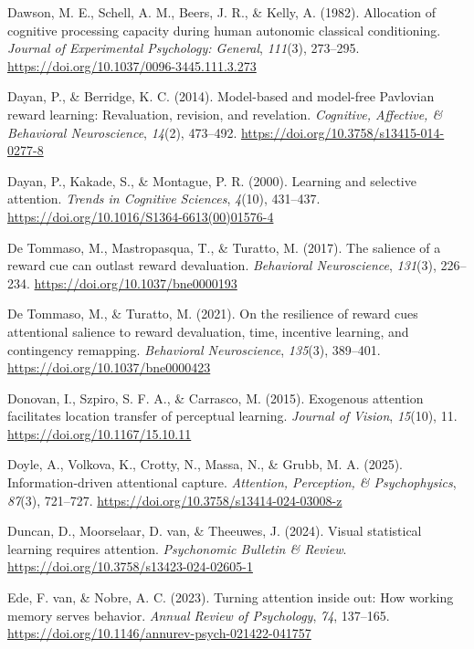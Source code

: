\documentclass[
  man,
  floatsintext,
  longtable,
  nolmodern,
  notxfonts,
  notimes,
  mask,
  colorlinks=true,linkcolor=blue,citecolor=blue,urlcolor=blue]{apa7}
\newlength{\cslhangindent}
\newenvironment{CSLReferences}[2] %
 {\begin{list}{}{%
  \setlength{\itemindent}{0pt}
  \setlength{\leftmargin}{0pt}
  \setlength{\parsep}{0pt}
  \ifodd #1
   \setlength{\leftmargin}{\cslhangindent}
   \setlength{\itemindent}{-1\cslhangindent}
  \fi
  \setlength{\itemsep}{#2\baselineskip}}}
 {\end{list}}
\begin{document}
\begin{CSLReferences}{1}{0}
Dawson, M. E., Schell, A. M., Beers, J. R., \& Kelly, A. (1982).
Allocation of cognitive processing capacity during human autonomic
classical conditioning. \emph{Journal of Experimental Psychology:
General}, \emph{111}(3), 273--295.
\url{https://doi.org/10.1037/0096-3445.111.3.273}

Dayan, P., \& Berridge, K. C. (2014). Model-based and model-free
Pavlovian reward learning: Revaluation, revision, and revelation.
\emph{Cognitive, Affective, \& Behavioral Neuroscience}, \emph{14}(2),
473--492. \url{https://doi.org/10.3758/s13415-014-0277-8}

Dayan, P., Kakade, S., \& Montague, P. R. (2000). Learning and selective
attention. \emph{Trends in Cognitive Sciences}, \emph{4}(10), 431--437.
\url{https://doi.org/10.1016/S1364-6613(00)01576-4}

De Tommaso, M., Mastropasqua, T., \& Turatto, M. (2017). The salience of
a reward cue can outlast reward devaluation. \emph{Behavioral
Neuroscience}, \emph{131}(3), 226--234.
\url{https://doi.org/10.1037/bne0000193}

De Tommaso, M., \& Turatto, M. (2021). On the resilience of reward cues
attentional salience to reward devaluation, time, incentive learning,
and contingency remapping. \emph{Behavioral Neuroscience},
\emph{135}(3), 389--401. \url{https://doi.org/10.1037/bne0000423}

Donovan, I., Szpiro, S. F. A., \& Carrasco, M. (2015). Exogenous
attention facilitates location transfer of perceptual learning.
\emph{Journal of Vision}, \emph{15}(10), 11.
\url{https://doi.org/10.1167/15.10.11}

Doyle, A., Volkova, K., Crotty, N., Massa, N., \& Grubb, M. A. (2025).
Information-driven attentional capture. \emph{Attention, Perception, \&
Psychophysics}, \emph{87}(3), 721--727.
\url{https://doi.org/10.3758/s13414-024-03008-z}

Duncan, D., Moorselaar, D. van, \& Theeuwes, J. (2024). Visual
statistical learning requires attention. \emph{Psychonomic Bulletin \&
Review}. \url{https://doi.org/10.3758/s13423-024-02605-1}

Ede, F. van, \& Nobre, A. C. (2023). Turning attention inside out: How
working memory serves behavior. \emph{Annual Review of Psychology},
\emph{74}, 137--165.
\url{https://doi.org/10.1146/annurev-psych-021422-041757}


\end{CSLReferences}
\end{document}

